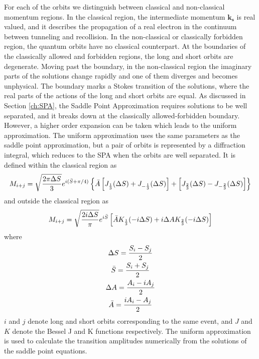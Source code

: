 \documentclass[11pt]{article}
\numberwithin{equation}{section}
\begin{document}
For each of the orbits we distinguish between classical and non-classical momentum regions. In the classical region, the intermediate momentum $\mathbf{k_s}$ is real valued, and it describes the propagation of a real electron in the continuum between tunneling and recollision. In the non-classical or classically forbidden region, the quantum orbits have no classical counterpart. At the boundaries of the classically allowed and forbidden regions, the long and short orbits are degenerate. Moving past the boundary, in the non-classical region the imaginary parts of the solutions change rapidly and one of them diverges and becomes unphysical. The boundary marks a Stokes transition of the solutions, where the real parts of the actions of the long and short orbits are equal. As discussed in Section \ref{ch:SPA}, the Saddle Point Approximation requires solutions to be well separated, and it breaks down at the classically allowed-forbidden boundary. However, a higher order expansion can be taken which leads to the uniform approximation\cite{figueirademorissonfaria_2002_highorder}. The uniform approximation uses the same parameters as the saddle point approximation, but a pair of orbits is represented by a diffraction integral, which reduces to the SPA when the orbits are well separated. It is defined within the classical region as
\begin{equation}  \label{eq:NSDI_class}
    M_{i+j} = \sqrt{\frac{2\pi \Delta S}{3}} e^{i(\Bar{S}+\pi/4)} \left \{ \Bar{A} \left [ J_{\frac{1}{3}}(\Delta S) + J_{-\frac{1}{3}}(\Delta S) \right ] + \left [ J_{\frac{2}{3}}(\Delta S) - J_{-\frac{2}{3}}(\Delta S) \right ]\right \}
\end{equation}
and outside the classical region as
\begin{equation} \label{eq:NSDI_forb}
    M_{i+j} = \sqrt{\frac{2i \Delta S}{\pi}} e^{i\Bar{S}} \left [ \Bar{A}K_{\frac{1}{3}}(-i\Delta S) + i \Delta A K_{\frac{2}{3}}(-i \Delta S) \right ]
\end{equation}
where
\begin{equation}
    \begin{gathered}
        \Delta S = \frac{S_i - S_j}{2} \\
        \Bar{S} = \frac{S_i + S_j}{2} \\
        \Delta A = \frac{A_i - i A_j}{2} \\
        \Bar{A} = \frac{iA_i - A_j}{2} 
    \end{gathered}
\end{equation}
\newline
$i$ and $j$ denote long and short orbits corresponding to the same event, and $J$ and $K$ denote the Bessel J and K functions respectively. The uniform approximation is used to calculate the transition amplitudes numerically from the solutions of the saddle point equations.
\end{document}

